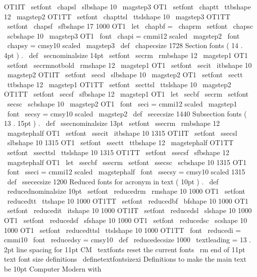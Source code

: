 {{{{{OT1IT
}
\
setfont
\
chapsl
\
slbshape
{
10
}
{
\
magstep3
}
{
OT1
}
\
setfont
\
chaptt
\
ttbshape
{
12
}
{
\
magstep2
}
{
OT1TT
}
\
setfont
\
chapttsl
\
ttslshape
{
10
}
{
\
magstep3
}
{
OT1TT
}
\
setfont
\
chapsf
\
sfbshape
{
17
}
{
1000
}
{
OT1
}
\
let
\
chapbf
=
\
chaprm
\
setfont
\
chapsc
\
scbshape
{
10
}
{
\
magstep3
}
{
OT1
}
\
font
\
chapi
=
cmmi12
scaled
\
magstep2
\
font
\
chapsy
=
cmsy10
scaled
\
magstep3
\
def
\
chapecsize
{
1728
}
%
Section
fonts
(
14
.
4pt
)
.
\
def
\
secnominalsize
{
14pt
}
\
setfont
\
secrm
\
rmbshape
{
12
}
{
\
magstep1
}
{
OT1
}
\
setfont
\
secrmnotbold
\
rmshape
{
12
}
{
\
magstep1
}
{
OT1
}
\
setfont
\
secit
\
itbshape
{
10
}
{
\
magstep2
}
{
OT1IT
}
\
setfont
\
secsl
\
slbshape
{
10
}
{
\
magstep2
}
{
OT1
}
\
setfont
\
sectt
\
ttbshape
{
12
}
{
\
magstep1
}
{
OT1TT
}
\
setfont
\
secttsl
\
ttslshape
{
10
}
{
\
magstep2
}
{
OT1TT
}
\
setfont
\
secsf
\
sfbshape
{
12
}
{
\
magstep1
}
{
OT1
}
\
let
\
secbf
\
secrm
\
setfont
\
secsc
\
scbshape
{
10
}
{
\
magstep2
}
{
OT1
}
\
font
\
seci
=
cmmi12
scaled
\
magstep1
\
font
\
secsy
=
cmsy10
scaled
\
magstep2
\
def
\
sececsize
{
1440
}
%
Subsection
fonts
(
13
.
15pt
)
.
\
def
\
ssecnominalsize
{
13pt
}
\
setfont
\
ssecrm
\
rmbshape
{
12
}
{
\
magstephalf
}
{
OT1
}
\
setfont
\
ssecit
\
itbshape
{
10
}
{
1315
}
{
OT1IT
}
\
setfont
\
ssecsl
\
slbshape
{
10
}
{
1315
}
{
OT1
}
\
setfont
\
ssectt
\
ttbshape
{
12
}
{
\
magstephalf
}
{
OT1TT
}
\
setfont
\
ssecttsl
\
ttslshape
{
10
}
{
1315
}
{
OT1TT
}
\
setfont
\
ssecsf
\
sfbshape
{
12
}
{
\
magstephalf
}
{
OT1
}
\
let
\
ssecbf
\
ssecrm
\
setfont
\
ssecsc
\
scbshape
{
10
}
{
1315
}
{
OT1
}
\
font
\
sseci
=
cmmi12
scaled
\
magstephalf
\
font
\
ssecsy
=
cmsy10
scaled
1315
\
def
\
ssececsize
{
1200
}
%
Reduced
fonts
for
acronym
in
text
(
10pt
)
.
\
def
\
reducednominalsize
{
10pt
}
\
setfont
\
reducedrm
\
rmshape
{
10
}
{
1000
}
{
OT1
}
\
setfont
\
reducedtt
\
ttshape
{
10
}
{
1000
}
{
OT1TT
}
\
setfont
\
reducedbf
\
bfshape
{
10
}
{
1000
}
{
OT1
}
\
setfont
\
reducedit
\
itshape
{
10
}
{
1000
}
{
OT1IT
}
\
setfont
\
reducedsl
\
slshape
{
10
}
{
1000
}
{
OT1
}
\
setfont
\
reducedsf
\
sfshape
{
10
}
{
1000
}
{
OT1
}
\
setfont
\
reducedsc
\
scshape
{
10
}
{
1000
}
{
OT1
}
\
setfont
\
reducedttsl
\
ttslshape
{
10
}
{
1000
}
{
OT1TT
}
\
font
\
reducedi
=
cmmi10
\
font
\
reducedsy
=
cmsy10
\
def
\
reducedecsize
{
1000
}
\
textleading
=
13
.
2pt
%
line
spacing
for
11pt
CM
\
textfonts
%
reset
the
current
fonts
\
rm
}
%
end
of
11pt
text
font
size
definitions
\
definetextfontsizexi
%
Definitions
to
make
the
main
text
be
10pt
Computer
Modern
with
%
}}}
